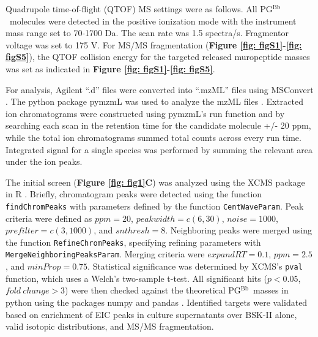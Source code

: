 \documentclass[twoside, watermark]{zHenriquesLab-StyleBioRxiv}
\newcommand{\pgbb}{PG$^\text{Bb}$}
\begin{document}
\vspace{1mm}
Quadrupole time-of-flight (QTOF) MS settings were as follows. All \pgbb~molecules were detected in the positive ionization mode with the instrument mass range set to 70-1700 Da. The scan rate was 1.5 spectra/s. Fragmentor voltage was set to 175 V. For MS/MS fragmentation (\textbf{Figure \ref{fig: figS1}-\ref{fig: figS5}}), the QTOF collision energy for the targeted released muropeptide masses was set as indicated in \textbf{Figure \ref{fig: figS1}-\ref{fig: figS5}}.

\vspace{1mm}
For analysis, Agilent “.d” files were converted into “.mzML” files using MSConvert \cite{Chambers2012}. The python package pymzmL was used to analyze the mzML files \cite{Bald2012}. Extracted ion chromatograms were constructed using pymzmL’s run function and by searching each scan in the retention time for the candidate molecule +/- 20 ppm, while the total ion chromatograms summed total counts across every run time. Integrated signal for a single species was performed by summing the relevant area under the ion peaks.

\vspace{1mm}
The initial screen (\textbf{Figure \ref{fig: fig1}C}) was analyzed using the XCMS package in R \cite{Gatto2021,Rainer2022,Smith2006}. Briefly, chromatogram peaks were detected using the function \texttt{findChromPeaks} with parameters defined by the function \texttt{CentWaveParam}. Peak criteria were defined as $ppm=20$, $peakwidth=c(6,30)$, $noise=1000$, $prefilter=c(3,1000)$, and $snthresh=8$. Neighboring peaks were merged using the function \texttt{RefineChromPeaks}, specifying refining parameters with \texttt{MergeNeighboringPeaksParam}. Merging criteria were $expandRT=0.1$, $ppm=2.5$, and $minProp=0.75$. Statistical significance was determined by XCMS’s \texttt{pval} function, which uses a Welch’s two-sample t-test. All significant hits ($p < 0.05$, $fold~change > 3$) were then checked against the theoretical \pgbb~masses in python using the packages numpy and pandas \cite{Harris2020,McKinney2011}. Identified targets were validated based on enrichment of EIC peaks in culture supernatants over BSK-II alone, valid isotopic distributions, and MS/MS fragmentation.
\end{document}
